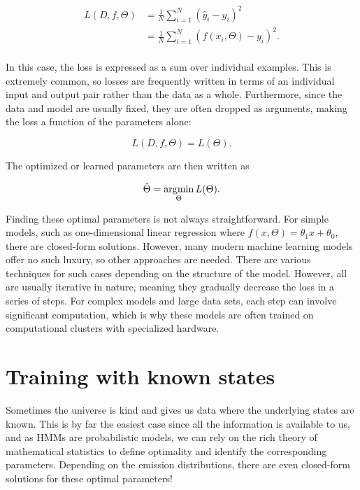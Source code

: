 \begin{align*}
L(D, f, \Theta)
&= \frac{1}{N} \sum_{i=1}^N \left( \hat{y}_i - y_i \right)^2 \\
&= \frac{1}{N} \sum_{i=1}^N \left( f(x_i, \Theta) - y_i \right)^2. \\
\end{align*}

In this case, the loss is expressed as a sum over individual examples. This is extremely common, so losses are frequently written in terms of an individual input and output pair rather than the data as a whole. Furthermore, since the data and model are usually fixed, they are often dropped as arguments, making the loss a function of the parameters alone:

\begin{equation*}
L(D, f, \Theta) = L(\Theta).
\end{equation*}

The optimized or learned parameters are then written as

\begin{equation*}
\hat{\Theta} = \operatorname*{arg\!\min}_\Theta L(\Theta).
\end{equation*}

Finding these optimal parameters is not always straightforward. For simple models, such as one-dimensional linear regression where $f(x, \Theta) = \theta_1 x + \theta_0$, there are closed-form solutions. However, many modern machine learning models offer no such luxury, so other approaches are needed. There are various techniques for such cases depending on the structure of the model. However, all are usually iterative in nature, meaning they gradually decrease the loss in a series of steps. For complex models and large data sets, each step can involve significant computation, which is why these models are often trained on computational clusters with specialized hardware.

\section{Training with known states}

Sometimes the universe is kind and gives us data where the underlying states are known. This is by far the easiest case since all the information is available to us, and as HMMs are probabilistic models, we can rely on the rich theory of mathematical statistics to define optimality and identify the corresponding parameters. Depending on the emission distributions, there are even closed-form solutions for these optimal parameters!

